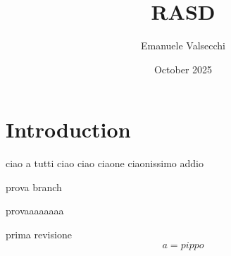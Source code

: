 \documentclass{article}
\title{RASD}
\author{Emanuele Valsecchi}
\date{October 2025}
\begin{document}
\maketitle

\section{Introduction}

ciao a tutti
ciao ciao
ciaone
ciaonissimo
addio


prova
branch

provaaaaaaaa

prima revisione\begin{equation}
    a = pippo
\end{equation}
\end{document}
